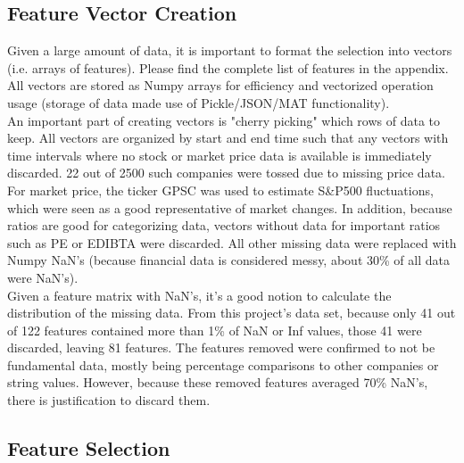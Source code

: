 \documentclass[preprint,12pt]{elsarticle}
\begin{document}
\subsection{Feature Vector Creation}

Given a large amount of data, it is important to format the selection into vectors (i.e. arrays of features). Please find the complete list of features in the appendix. All vectors are stored as Numpy arrays for efficiency and vectorized operation usage (storage of data made use of Pickle/JSON/MAT functionality). \\

An important part of creating vectors is "cherry picking" which rows of data to keep. All vectors are organized by start and end time such that any vectors with time intervals where no stock or market price data is available is immediately discarded. 22 out of 2500 such companies were tossed due to missing price data. For market price, the ticker GPSC was used to estimate S\&P500 fluctuations, which were seen as a good representative of market changes. In addition, because ratios are good for categorizing data, vectors without data for important ratios such as PE or EDIBTA were discarded. All other missing data were replaced with Numpy NaN's (because financial data is considered messy, about 30\% of all data were NaN's).\\

Given a feature matrix with NaN's, it's a good notion to calculate the distribution of the missing data. From this project's data set, because only 41 out of 122 features contained more than 1\% of NaN or Inf values, those 41 were discarded, leaving 81 features. The features removed were confirmed to not be fundamental data, mostly being percentage comparisons to other companies or string values. However, because these removed features averaged 70\% NaN's, there is justification to discard them. 



\subsection{Feature Selection}
\end{document}
